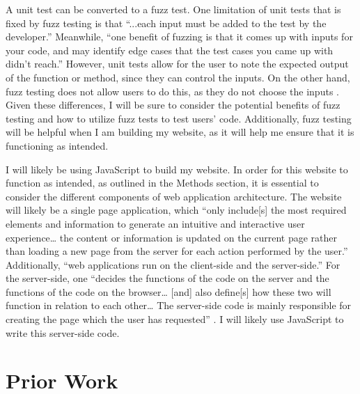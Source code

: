 \documentclass[10pt,twocolumn]{article}
\begin{document}
A unit test can be converted to a fuzz test. One limitation of unit tests that is fixed by fuzz testing is that “...each input must be added to the test by the developer.” Meanwhile, “one benefit of fuzzing is that it comes up with inputs for your code, and may identify edge cases that the test cases you came up with didn’t reach.” However, unit tests allow for the user to note the expected output of the function or method, since they can control the inputs. On the other hand, fuzz testing does not allow users to do this, as they do not choose the inputs \cite{FuzzTutorial}. Given these differences, I will be sure to consider the potential benefits of fuzz testing and how to utilize fuzz tests to test users’ code. Additionally, fuzz testing will be helpful when I am building my website, as it will help me ensure that it is functioning as intended.  

I will likely be using JavaScript to build my website. In order for this website to function as intended, as outlined in the Methods section, it is essential to consider the different components of web application architecture. The website will likely be a single page application, which “only include[s] the most required elements and information to generate an intuitive and interactive user experience… the content or information is updated on the current page rather than loading a new page from the server for each action performed by the user.” Additionally, “web applications run on the client-side and the server-side.” For the server-side, one “decides the functions of the code on the server and the functions of the code on the browser… [and] also define[s] how these two will function in relation to each other… The server-side code is mainly responsible for creating the page which the user has requested” \cite{Architecture}. I will likely use JavaScript to write this server-side code.  

\section{Prior Work}
\end{document}
